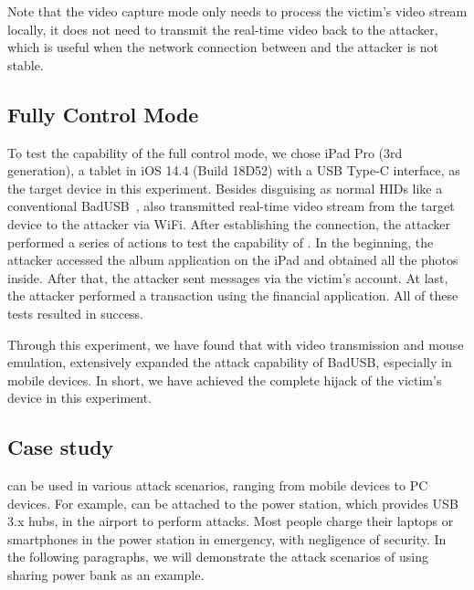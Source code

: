 Note that the video capture mode only needs to
process the victim's video stream locally, it does not need to transmit the real-time video back to the attacker, which is useful when the network connection between \tool and the attacker is not stable.

\subsection{Fully Control Mode}

To test the capability of the full control mode, we chose iPad Pro (3rd
	generation), a tablet in iOS 14.4 (Build 18D52) with a \ac{USB} Type-C interface, as the target
device in this experiment.  Besides disguising as normal \acp{HID} like a
conventional BadUSB~\cite{badusb}, \tool also transmitted real-time video
stream from the target device to the attacker via WiFi.  After establishing the connection, the attacker performed a series of actions to test the capability of
\tool. In the beginning, the attacker accessed the album application on the iPad and
obtained all the photos inside. After that, the attacker sent messages via the victim's
account. At last, the attacker performed a transaction using the
financial application. All of these tests resulted in success.

Through this experiment, we have found that with video transmission and mouse
emulation, \tool extensively expanded the attack capability of BadUSB,
especially in mobile devices. In short, we have achieved the complete hijack of the victim's
device in this experiment.

\subsection{Case study}
\label{subsec:case_study}
\tool can be used in various attack scenarios, ranging from mobile devices to PC devices.
For example, \tool can be attached to the power station, which provides USB 3.x hubs, in the airport to perform attacks.
Most people charge their laptops or smartphones in the power station in emergency, with negligence of security.
In the following paragraphs, we will demonstrate the attack scenarios of \tool using sharing power bank as an example.

